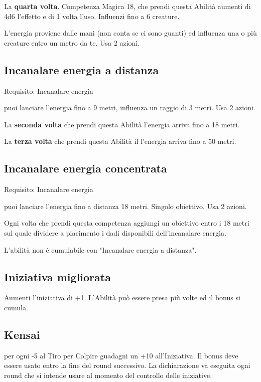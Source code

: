 \documentclass[a4paper,11pt,twoside,openany]{book}
\begin{document}
La \textbf{quarta volta}. Competenza Magica 18, che prendi questa Abilità aumenti di 4d6 l'effetto e di 1 volta l'uso. Influenzi fino a 6 creature.

L'energia proviene dalle mani (non conta se ci sono guanti) ed influenza una o più creature entro un metro da te. Usa 2 azioni.

\subsection{Incanalare energia a distanza}

Requisito: Incanalare energia

puoi lanciare l'energia fino a 9 metri, influenza un raggio di 3 metri. Usa 2 azioni.

La \textbf{seconda volta} che prendi questa Abilità l'energia arriva fino a 18 metri.

La \textbf{terza volta} che prendi questa Abilità il l'energia arriva fino a 50 metri.

\subsection{Incanalare energia concentrata}

Requisito: Incanalare energia

puoi lanciare l'energia fino a distanza 18 metri. Singolo obiettivo. Usa 2 azioni.

Ogni volta che prendi questa competenza aggiungi un obiettivo entro i 18 metri sul quale dividere a piacimento i dadi disponibili dell'incanalare energia.

L'abilità non è cumulabile con "Incanalare energia a distanza".

\subsection{Iniziativa migliorata}

Aumenti l'iniziativa di +1. L'Abilità può essere presa più volte ed il bonus si cumula.

\subsection{Kensai}

per ogni -5 al Tiro per Colpire guadagni un +10 all'Iniziativa. Il bonus deve essere usato entro la fine del round successivo. La dichiarazione va eseguita ogni round che si intende usare al momento del controllo delle iniziative.
\end{document}
